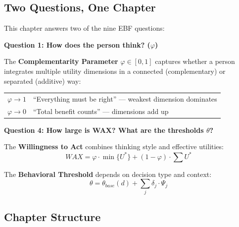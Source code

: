 \subsection{Two Questions, One Chapter}
\label{subsec:12-1-two-questions}

This chapter answers two of the nine EBF questions:

\begin{tcolorbox}[
  colback=white,
  colframe=blue!50!black,
  title={\textbf{Questions Addressed in This Chapter}},
  fonttitle=\bfseries\sffamily
]

\textbf{Question 1: How does the person think? ($\varphi$)}

The \textbf{Complementarity Parameter} $\varphi \in [0,1]$ captures whether 
a person integrates multiple utility dimensions in a connected (complementary) 
or separated (additive) way:

\begin{center}
\begin{tabular}{lp{8cm}}
$\varphi \to 1$ & ``Everything must be right'' — weakest dimension dominates\\
$\varphi \to 0$ & ``Total benefit counts'' — dimensions add up\\
\end{tabular}
\end{center}

\vspace{6pt}
\textbf{Question 4: How large is WAX? What are the thresholds $\theta$?}

The \textbf{Willingness to Act} combines thinking style and effective utilities:
\begin{equation*}
WAX = \varphi \cdot \min\{U^*\} + (1-\varphi) \cdot \sum U^*
\end{equation*}

The \textbf{Behavioral Threshold} depends on decision type and context:
\begin{equation*}
\theta = \theta_{base}(d) + \sum_j \delta_j \cdot \Psi_j
\end{equation*}

\end{tcolorbox}

\subsection{Chapter Structure}
\label{subsec:12-1-structure}

